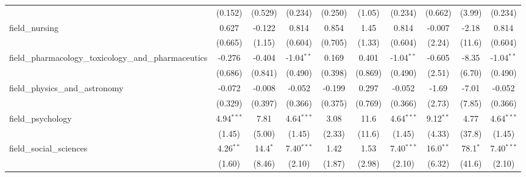 \begin{tabular}{lccccccccc}
                                                               & (0.152)        & (0.529)        & (0.234)        & (0.250)       & (1.05)         & (0.234)        & (0.662)       & (3.99)       & (0.234)\\   
   field\_nursing                                              & 0.627          & -0.122         & 0.814          & 0.854         & 1.45           & 0.814          & -0.007        & -2.18        & 0.814\\   
                                                               & (0.665)        & (1.15)         & (0.604)        & (0.705)       & (1.33)         & (0.604)        & (2.24)        & (11.6)       & (0.604)\\   
   field\_pharmacology\_toxicology\_and\_pharmaceutics         & -0.276         & -0.404         & -1.04$^{**}$   & 0.169         & 0.401          & -1.04$^{**}$   & -0.605        & -8.35        & -1.04$^{**}$\\   
                                                               & (0.686)        & (0.841)        & (0.490)        & (0.398)       & (0.869)        & (0.490)        & (2.51)        & (6.70)       & (0.490)\\   
   field\_physics\_and\_astronomy                              & -0.072         & -0.008         & -0.052         & -0.199        & 0.297          & -0.052         & -1.69         & -7.01        & -0.052\\   
                                                               & (0.329)        & (0.397)        & (0.366)        & (0.375)       & (0.769)        & (0.366)        & (2.73)        & (7.85)       & (0.366)\\   
   field\_psychology                                           & 4.94$^{***}$   & 7.81           & 4.64$^{***}$   & 3.08          & 11.6           & 4.64$^{***}$   & 9.12$^{**}$   & 4.77         & 4.64$^{***}$\\   
                                                               & (1.45)         & (5.00)         & (1.45)         & (2.33)        & (11.6)         & (1.45)         & (4.33)        & (37.8)       & (1.45)\\   
   field\_social\_sciences                                     & 4.26$^{**}$    & 14.4$^{*}$     & 7.40$^{***}$   & 1.42          & 1.53           & 7.40$^{***}$   & 16.0$^{**}$   & 78.1$^{*}$   & 7.40$^{***}$\\   
                                                               & (1.60)         & (8.46)         & (2.10)         & (1.87)        & (2.98)         & (2.10)         & (6.32)        & (41.6)       & (2.10)\\   

\end{tabular}
